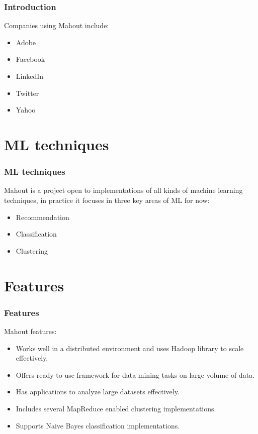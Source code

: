 \documentclass{beamer}
\begin{document}
\begin{frame}
\frametitle{Introduction}
Companies using Mahout include:
\begin{itemize}
	\item Adobe\\
	\item Facebook\\
	\item LinkedIn\\
	\item Twitter\\
	\item Yahoo
\end{itemize}
\end{frame}


\section{ML techniques}

\begin{frame}
\frametitle{ML techniques}
Mahout is a project open to implementations of all kinds of machine learning techniques, in practice it focuses in three key areas of ML for now:
\begin{itemize}
	\item Recommendation\\
	\item Classification\\
	\item Clustering
\end{itemize}
\end{frame}


\section{Features}

\begin{frame}
\frametitle{Features}
Mahout features:
\begin{itemize}
	\item Works well in a distributed environment and uses Hadoop library to scale effectively.\\
	\item Offers ready-to-use framework for data mining tasks on large volume of data.\\
	\item Has applications to analyze large datasets effectively.\\
	\item Includes several MapReduce enabled clustering implementations.\\
	\item Supports Naive Bayes classification implementations.
\end{itemize}
\end{frame}
\end{document}
